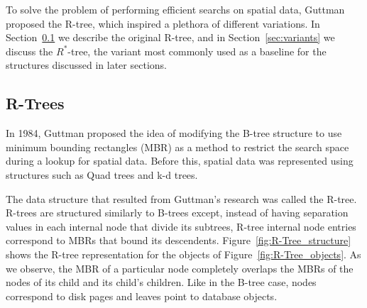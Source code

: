 To solve the problem of performing efficient searchs on spatial data, 
Guttman proposed the R-tree, which inspired a plethora of different 
variations. In Section~\ref{sec:rtrees} we describe the original R-tree, 
and in Section~\ref{sec:variants} we discuss the $R^{*}$-tree, the variant most 
commonly used as a baseline for the structures discussed in later sections.

\subsection{R-Trees}
\label{sec:rtrees}
In 1984, Guttman proposed the idea of modifying the B-tree structure to
use minimum bounding rectangles (MBR) as a method to restrict the search space 
during a lookup for spatial data\cite{guttman84}. Before this, spatial data was
represented using structures such as Quad trees\cite{} and k-d trees\cite{}.

The data structure that resulted from Guttman's research
was called the R-tree. R-trees are structured similarly to B-trees except, instead 
of having separation values in each internal node that divide its subtrees, R-tree 
internal node entries correspond to MBRs that bound its descendents. 
Figure~\ref{fig:R-Tree_structure} shows the R-tree representation for the objects 
of Figure~\ref{fig:R-Tree_objects}. As we observe, the MBR of a particular node 
completely overlaps the MBRs of the nodes of its child and its child's children. 
Like in the B-tree case, nodes correspond to disk pages and leaves point to 
database objects.

